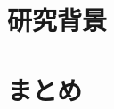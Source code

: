 \documentclass[a4j,twoside]{jarticle}
\begin{document}
\twocolumn[\vspace*{9mm}]
\begin{論文概要}
\setcounter{page}{1}


\section{研究背景}




\section{まとめ}




\begin{thebibliography}{1}
    \bibitem{}
\end{thebibliography}

\clearpage
\end{論文概要}
\end{document}
